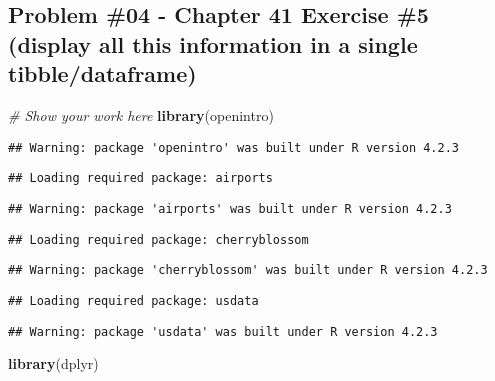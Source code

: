\documentclass[
]{article}
\newenvironment{Shaded}{\begin{snugshade}}{\end{snugshade}}
\newcommand{\CommentTok}[1]{\textcolor[rgb]{0.56,0.35,0.01}{\textit{#1}}}
\newcommand{\FunctionTok}[1]{\textcolor[rgb]{0.13,0.29,0.53}{\textbf{#1}}}
\newcommand{\NormalTok}[1]{#1}
\begin{document}
\newpage

\hypertarget{problem-04---chapter-41-exercise-5-display-all-this-information-in-a-single-tibbledataframe}{%
\subsection{Problem \#04 - Chapter 41 Exercise \#5 (display all this
information in a single
tibble/dataframe)}\label{problem-04---chapter-41-exercise-5-display-all-this-information-in-a-single-tibbledataframe}}

\begin{Shaded}
\begin{Highlighting}[]
\CommentTok{\# Show your work here}
\FunctionTok{library}\NormalTok{(openintro)}
\end{Highlighting}
\end{Shaded}

\begin{verbatim}
## Warning: package 'openintro' was built under R version 4.2.3
\end{verbatim}

\begin{verbatim}
## Loading required package: airports
\end{verbatim}

\begin{verbatim}
## Warning: package 'airports' was built under R version 4.2.3
\end{verbatim}

\begin{verbatim}
## Loading required package: cherryblossom
\end{verbatim}

\begin{verbatim}
## Warning: package 'cherryblossom' was built under R version 4.2.3
\end{verbatim}

\begin{verbatim}
## Loading required package: usdata
\end{verbatim}

\begin{verbatim}
## Warning: package 'usdata' was built under R version 4.2.3
\end{verbatim}

\begin{Shaded}
\begin{Highlighting}[]
\FunctionTok{library}\NormalTok{(dplyr)}
\end{Highlighting}
\end{Shaded}
\end{document}

